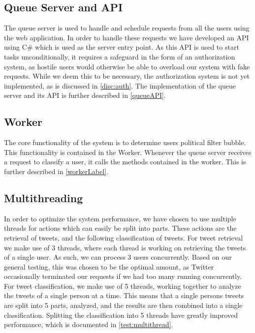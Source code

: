 \subsection{Queue Server and API}
The queue server is used to handle and schedule requests from all the users
using the web application. In order to handle these requests we have developed
an API using C\# which is used as the server entry point. As this API is used to
start tasks unconditionally, it requires a safeguard in the form of an
authorization system, as hostile users would otherwise be able to overload our
system with fake requests. While we deem this to be necessary, the
authorization system is not yet implemented, as is discussed in
\autoref{disc:auth}. The implementation of the queue server and its API is
further described in \autoref{queueAPI}.

\subsection{Worker}
The core functionality of the system is to determine users political filter
bubble. This functionality is contained in the Worker. Whenever the queue server
receives a request to classify a user, it calls the methods contained in the
worker. This is further described in \autoref{workerLabel}.

\subsection{Multithreading}\label{subs:multithread}
In order to optimize the system performance, we have chosen to use multiple
threads for actions which can easily be split into parts. These actions are the
retrieval of tweets, and the following classification of tweets. For tweet
retrieval we make use of 3 threads, where each thread is working on retrieving
the tweets of a single user. As such, we can process 3 users concurrently. Based
on our general testing, this was chosen to be the optimal amount, as Twitter
occasionally terminated our requests if we had too many running concurrently.\\
For tweet classification, we make use of 5 threads, working together to analyze
the tweets of a single person at a time. This means that a single persons tweets
are split into 5 parts, analyzed, and the results are then combined into a
single classification. Splitting the classification into 5 threads have greatly
improved performance, which is documented in \autoref{test:multithread}.

